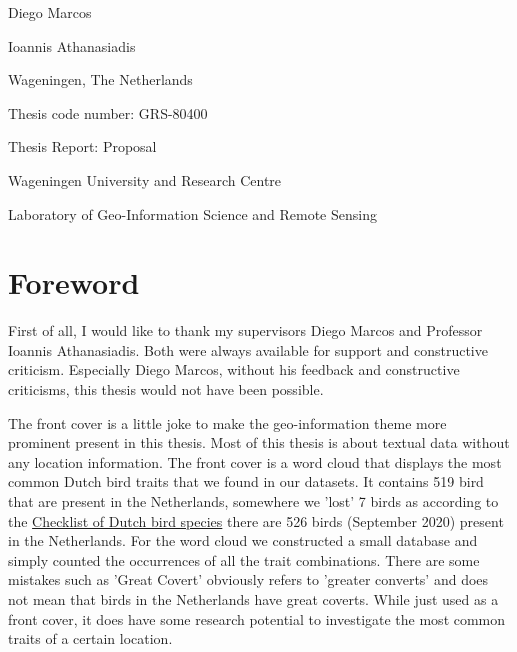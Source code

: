 \documentclass[a4paper, 12pt, oneside]{book} %
\begin{document}
\begin{titlingpage}
\begin{center}
  {Diego Marcos}
  
  {Ioannis Athanasiadis}\vspace{3.0cm}
  
  
  
  \end{center}
  
  \begin{center}
    {\thedate}
  
    {Wageningen, The Netherlands}
  \end{center}\vspace{5cm}

    Thesis code number: GRS-80400
  
    Thesis Report: Proposal
  
    {Wageningen University and Research Centre}
  
    {Laboratory of Geo-Information Science and Remote Sensing}
 \end{titlingpage}
 \restoregeometry
\graphicspath{ {./figures/} }

\newpage
\thispagestyle{empty}
\section*{Foreword}
First of all, I would like to thank my supervisors Diego Marcos and Professor Ioannis Athanasiadis.
Both were always available for support and constructive criticism.
Especially Diego Marcos, without his feedback and constructive criticisms, this thesis would not have been possible.
\newline

\noindent
The front cover is a little joke to make the geo-information theme more prominent present in this thesis. 
Most of this thesis is about textual data without any location information.
The front cover is a word cloud that displays the most common Dutch bird traits that we found in our datasets. 
It contains 519 bird that are present in the Netherlands, somewhere we 'lost' 7 birds as according to the \href{https://avibase.bsc-eoc.org/checklist.jsp?region=NL&list=howardmoore}{Checklist of Dutch bird species} there are 526 birds (September 2020) present in the Netherlands.
For the word cloud we constructed a small database and simply counted the occurrences of all the trait combinations.
There are some mistakes such as 'Great Covert' obviously refers to 'greater converts' and does not mean that birds in the Netherlands have great coverts.  
While just used as a front cover, it does have some research potential to investigate the most common traits of a certain location.
\end{document}
